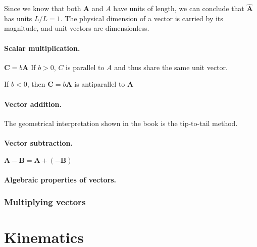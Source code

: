 \documentclass{article}
\numberwithin{theorem}{section}
\numberwithin{corollary}{section}
\numberwithin{postulate}{section}
\numberwithin{lemma}{section}
\theoremstyle{definition}
\numberwithin{definition}{section}
\renewcommand{\vec}[1]{\mathbf{#1}}
\let\oldhat\hat
\renewcommand{\hat}[1]{\oldhat{\mathbf{#1}}}
\begin{document}
Since we know that both $\vec{A}$ and $A$ have units of length, we can conclude
that $\hat{A}$ has units $L/L = 1$. The physical dimension of a vector is
carried by its magnitude, and unit vectors are dimensionless.

\paragraph{Scalar multiplication.} $\vec{C} = b\vec{A}$ If $b > 0$, $C$ is
parallel to $A$ and thus share the same unit vector.

If $b < 0$, then $\vec{C} = b\vec{A}$ is antiparallel to $\vec{A}$ 

\paragraph{Vector addition.} The geometrical interpretation shown in the book is
the tip-to-tail method.

\paragraph{Vector subtraction.} $\vec{A} - \vec{B} = \vec{A} + (- \vec{B})$

\paragraph{Algebraic properties of vectors.}

\subsubsection{Multiplying vectors}

\section{Kinematics}
\end{document}
